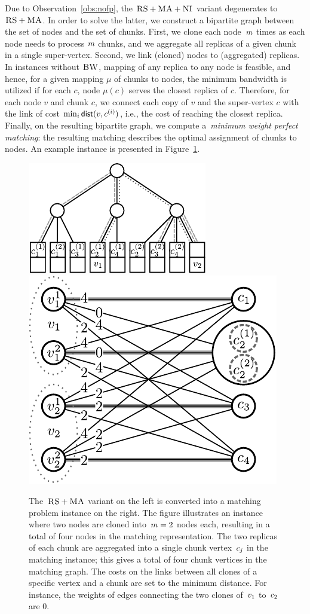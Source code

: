  Due to Observation~\ref{obs:nofp}, the $\textsc{RS}+\textsc{MA}+\textsc{NI}$ variant degenerates to~$\textsc{RS}+\textsc{MA}$.
In order to solve the latter,
we construct a bipartite
graph between the set
of nodes and
the set of chunks.
First, we clone each node~$m$ times
as each node needs to process
$m$ chunks, and we aggregate all replicas of a given chunk in a
single %
super-vertex.
Second, we link (cloned) nodes to (aggregated) replicas.
In instances without $\textsc{BW}$, mapping of any replica to any node is feasible, and hence, for a given mapping $\mu$ of chunks to nodes, the minimum bandwidth is utilized if for each $c$, node $\mu(c)$ serves the closest replica of $c$.
Therefore, for each node $v$ and chunk $c$, we connect each copy of $v$ and the super-vertex $c$ with the link of cost $\min_i \mathrm{\textsf{dist}}(v,c^{(i)})$, i.e., the cost of reaching the closest replica.
Finally, on the resulting bipartite graph, we compute a~\emph{minimum weight
perfect
matching}:
the resulting matching describes the optimal assignment of chunks to nodes.
An example instance is presented in Figure~\ref{fig:matching}.


\begin{figure}
  \centering
  \includegraphics[width = 0.39\columnwidth]{figs/static-mapping/model_ma_r_cv_boxes}
  \centering
  \hspace{1cm}
  \includegraphics[width =0.39\columnwidth]{figs/static-mapping/matching}
\caption{The~$\textsc{RS}+\textsc{MA}$ variant on the left is converted into a
  matching problem instance on the right.
The figure illustrates
an instance where two nodes are
cloned into~$m = 2$ nodes each,
resulting in a total of four nodes in
the matching representation.
The two replicas of each chunk are
aggregated into a single chunk vertex~$c_j$  in the matching instance;
this gives a total of four chunk vertices in the matching graph. The costs
on the links between all clones of a specific vertex and a chunk are set to
the minimum distance. For instance, the weights of edges connecting
the two clones of~$v_1$ to~$c_2$ are 0.
}
\label{fig:matching}
\end{figure}

